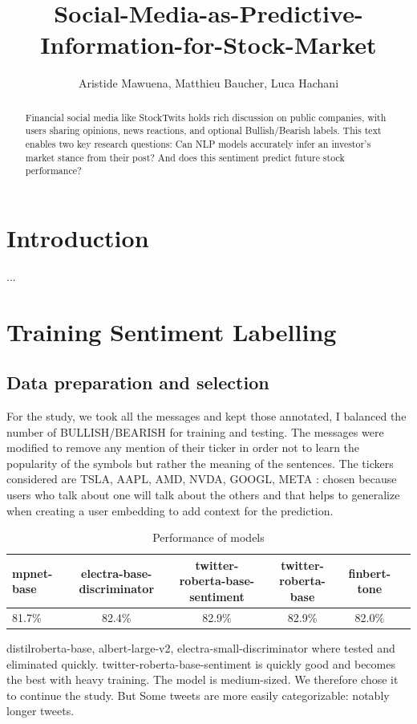 \documentclass{article}
\title{Social-Media-as-Predictive-Information-for-Stock-Market}
\author{Aristide Mawuena, Matthieu Baucher, Luca Hachani}
\begin{document}
\maketitle

\begin{abstract}
Financial social media like StockTwits holds rich discussion on public companies, with users sharing opinions, news reactions, and optional Bullish/Bearish labels. This text enables two key research questions: Can NLP models accurately infer an investor's market stance from their post? And does this sentiment predict future stock performance?
\end{abstract}

\section*{Introduction}

...

\section{Training Sentiment Labelling}
\subsection{Data preparation and selection}
For the study, we took all the messages and kept those annotated, I balanced the number of BULLISH/BEARISH for training and testing.
The messages were modified to remove any mention of their ticker in order not to learn the popularity of the symbols but rather the meaning of the sentences.
The tickers considered are TSLA, AAPL, AMD, NVDA, GOOGL, META : chosen because users who talk about one will talk about the others and that helps to generalize when creating a user embedding to add context for the prediction.


\begin{longtable}{lccccc}
\caption{Performance of models} \\
\toprule
   {\small mpnet-base} 
 & {\small electra-base-discriminator} 
 & {\small twitter-roberta-base-sentiment} 
 & {\small twitter-roberta-base} 
 & {\small finbert-tone} \\
\midrule
81.7\% & 82.4\% & 82.9\% & 82.9\% & 82.0\% \\
\bottomrule
\end{longtable}
\vspace{1mm}
distilroberta-base, albert-large-v2, electra-small-discriminator where tested and eliminated quickly. 
twitter-roberta-base-sentiment is quickly good and becomes the best with heavy 
training. The model is medium-sized. We therefore chose it to continue the study.
But Some tweets are more easily categorizable: notably longer tweets.
\end{document}
